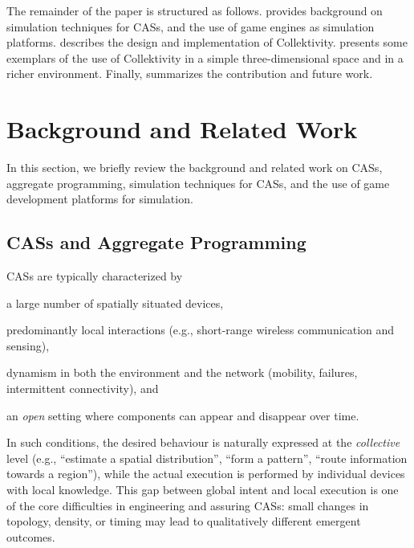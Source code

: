 \documentclass[runningheads]{llncs}
\newenvironment{inlinelist}{\begin{enumerate*}[label=\emph{(\roman*)}]}{\end{enumerate*}}
\begin{document}
The remainder of the paper is structured as follows.
 provides background on
simulation techniques for \acp{CAS}, 
and the use of game engines as simulation platforms.
 describes the design and implementation of Collektivity.
 presents some exemplars of the use of Collektivity in a simple three-dimensional space and in a richer environment.
Finally,  summarizes the contribution and future work.

\section{Background and Related Work}\label{sec:bg}

In this section,
we briefly review the background and related work on \acp{CAS}, aggregate programming,
simulation techniques for \acp{CAS}, and the use of game development platforms for simulation.

\subsection{\aclp{CAS} and Aggregate Programming}\label{sec:cas-aggregate-programming}

\aclp{CAS} are typically characterized by
\begin{inlinelist}
    \item a large number of spatially situated devices,
    \item predominantly local interactions (e.g., short-range wireless communication and sensing),
    \item dynamism in both the environment and the network (mobility, failures, intermittent connectivity),
    and
    \item an \emph{open} setting where components can appear and disappear over time.
\end{inlinelist}
%
In such conditions, the desired behaviour is naturally expressed at the \emph{collective} level
(e.g., ``estimate a spatial distribution'', ``form a pattern'', ``route information towards a region''),
while the actual execution is performed by individual devices with local knowledge.
%
This gap between global intent and local execution is one of the core difficulties in engineering and
assuring \acp{CAS}: small changes in topology, density, or timing may lead to qualitatively different
emergent outcomes.
\end{document}
